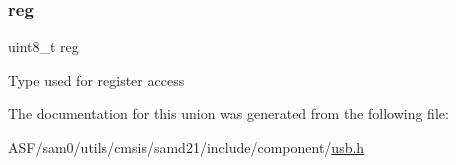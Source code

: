 \subsubsection{\texorpdfstring{reg}{reg}}
{\footnotesize\ttfamily uint8\+\_\+t reg}

Type used for register access 

The documentation for this union was generated from the following file\+:\begin{DoxyCompactItemize}
\item 
A\+S\+F/sam0/utils/cmsis/samd21/include/component/\mbox{\hyperlink{component_2usb_8h}{usb.\+h}}\end{DoxyCompactItemize}
